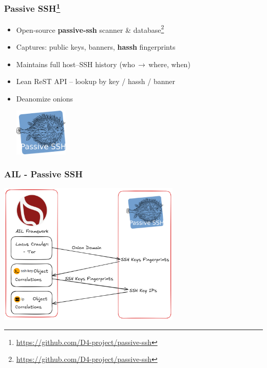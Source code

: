 \documentclass[10pt,aspectratio=169, colorlinks=true, linkcolor=circlBlue]{beamer}
\begin{document}
\begin{frame}
\frametitle{Passive SSH\footnote{\url{https://github.com/D4-project/passive-ssh}}}
\begin{itemize}
    \item Open‑source \textbf{passive‑ssh} scanner \& database\footnote{\url{https://github.com/D4-project/passive-ssh}}
    \item Captures: public keys, banners, \textbf{hassh} fingerprints
    \item Maintains full host–SSH history (who\,$\rightarrow$\,where, when)
    \item Lean ReST API – lookup by key / hassh / banner
    \item Deanomize onions
    \begin{center}
        \includegraphics[width=0.2\textwidth]{./img/passivessh.png}
    \end{center}
\end{itemize}
\end{frame}

\begin{frame}
\frametitle{AIL - Passive SSH}
    \begin{center}
        \includegraphics[width=0.65\textwidth]{./img/ssh-crawler.png}
    \end{center}
\end{frame}
\end{document}
